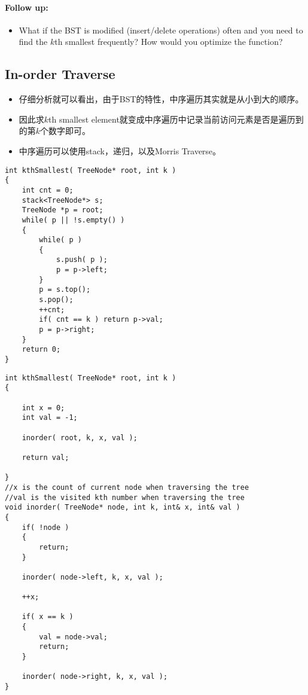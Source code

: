 \paragraph{Follow up:}
\begin{itemize}
\item What if the BST is modified (insert/delete operations) often and you need to find the $k$th smallest frequently? How would you optimize the function?
\end{itemize}
\subsection{In-order Traverse}
\begin{CJK*}{UTF8}{gbsn}
\begin{itemize}
\item 仔细分析就可以看出，由于BST的特性，中序遍历其实就是从小到大的顺序。
\item 因此求$k$th smallest element就变成中序遍历中记录当前访问元素是否是遍历到的第$k$个数字即可。
\item 中序遍历可以使用stack，递归，以及Morris Traverse。
\end{itemize}
\end{CJK*}
\setcounter{lstlisting}{0}
\begin{lstlisting}[style=customc, caption={Stack Based In-order Traverse}]
int kthSmallest( TreeNode* root, int k )
{
    int cnt = 0;
    stack<TreeNode*> s;
    TreeNode *p = root;
    while( p || !s.empty() )
    {
        while( p )
        {
            s.push( p );
            p = p->left;
        }
        p = s.top();
        s.pop();
        ++cnt;
        if( cnt == k ) return p->val;
        p = p->right;
    }
    return 0;
}
\end{lstlisting}
\begin{lstlisting}[style=customc, caption={Recursion Based In-order Traverse}]
int kthSmallest( TreeNode* root, int k )
{

    int x = 0;
    int val = -1;

    inorder( root, k, x, val );

    return val;

}
//x is the count of current node when traversing the tree
//val is the visited kth number when traversing the tree
void inorder( TreeNode* node, int k, int& x, int& val )
{
    if( !node )
    {
        return;
    }

    inorder( node->left, k, x, val );

    ++x;

    if( x == k )
    {
        val = node->val;
        return;
    }

    inorder( node->right, k, x, val );
}
\end{lstlisting}
